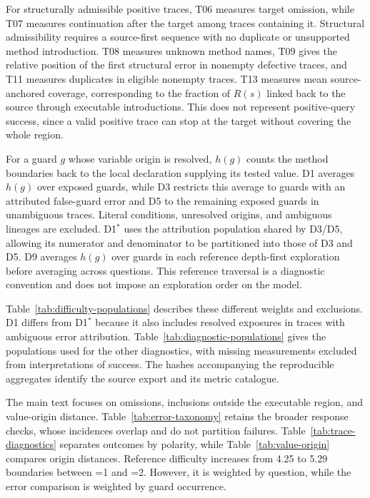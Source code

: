 \vspace{0.2cm}

For structurally admissible positive traces, T06 measures target omission, while T07 measures continuation after the target among traces containing it. Structural admissibility requires a source-first sequence with no duplicate or unsupported method introduction. T08 measures unknown method names, T09 gives the relative position of the first structural error in nonempty defective traces, and T11 measures duplicates in eligible nonempty traces. T13 measures mean source-anchored coverage, corresponding to the fraction of $R(s)$ linked back to the source through executable introductions. This does not represent positive-query success, since a valid positive trace can stop at the target without covering the whole region.

\vspace{0.2cm}

For a guard $g$ whose variable origin is resolved, $h(g)$ counts the method boundaries back to the local declaration supplying its tested value. D1 averages $h(g)$ over exposed guards, while D3 restricts this average to guards with an attributed false-guard error and D5 to the remaining exposed guards in unambiguous traces. Literal conditions, unresolved origins, and ambiguous lineages are excluded. D1$^*$ uses the attribution population shared by D3/D5, allowing its numerator and denominator to be partitioned into those of D3 and D5. D9 averages $h(g)$ over guards in each reference depth-first exploration before averaging across questions. This reference traversal is a diagnostic convention and does not impose an exploration order on the model.

\vspace{0.2cm}

Table~\ref{tab:difficulty-populations} describes these different weights and exclusions. D1 differs from D1$^*$ because it also includes resolved exposures in traces with ambiguous error attribution. Table~\ref{tab:diagnostic-populations} gives the populations used for the other diagnostics, with missing measurements excluded from interpretations of success. The hashes accompanying the reproducible aggregates identify the source export and its metric catalogue.

The main text focuses on omissions, inclusions outside the executable region, and value-origin distance. Table~\ref{tab:error-taxonomy} retains the broader response checks, whose incidences overlap and do not partition failures. Table~\ref{tab:trace-diagnostics} separates outcomes by polarity, while Table~\ref{tab:value-origin} compares origin distances. Reference difficulty increases from 4.25 to 5.29 boundaries between =1 and =2. However, it is weighted by question, while the error comparison is weighted by guard occurrence.

